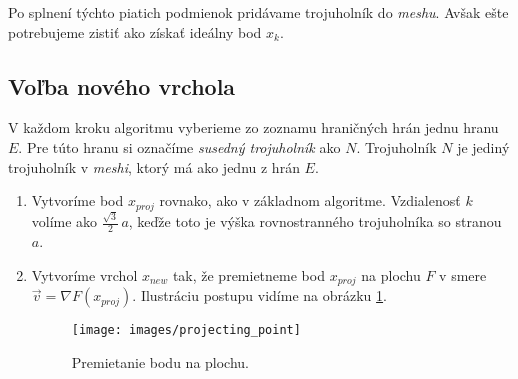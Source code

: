 
Po splnení týchto piatich podmienok pridávame trojuholník do \textit{meshu}. Avšak ešte potrebujeme zistiť 
ako získať ideálny bod $x_k$.

\subsection{Voľba nového vrchola}
\label{kap:finding_new_vertex}

V každom kroku algoritmu vyberieme zo zoznamu hraničných hrán jednu hranu $E$. Pre túto hranu si 
označíme \textit{susedný trojuholník} ako $N$. Trojuholník $N$ je jediný trojuholník v \textit{meshi}, 
ktorý má ako jednu z hrán $E$. 

\begin{enumerate}
    \item{
        Vytvoríme bod $x_{proj}$ rovnako, ako v základnom algoritme. Vzdialenosť $k$ volíme
        ako $\frac{\sqrt 3}{2} \, a$, keďže toto je výška rovnostranného trojuholníka so stranou $a$.
    }
    \item{
        Vytvoríme vrchol $x_{new}$ tak, že premietneme bod $x_{proj}$ na plochu $F$ v smere 
        $\vec{v} = \nabla F(x_{proj})$. Ilustráciu postupu vidíme na obrázku \ref{obr:projecting_point}.

        \begin{figure}
            \centerline{\texttt{[image: images/projecting\_point]}}
            \caption[Premietanie bodu na zadanú plochu]{Premietanie bodu na plochu.}
            \label{obr:projecting_point}
        \end{figure}

}
\end{enumerate}
